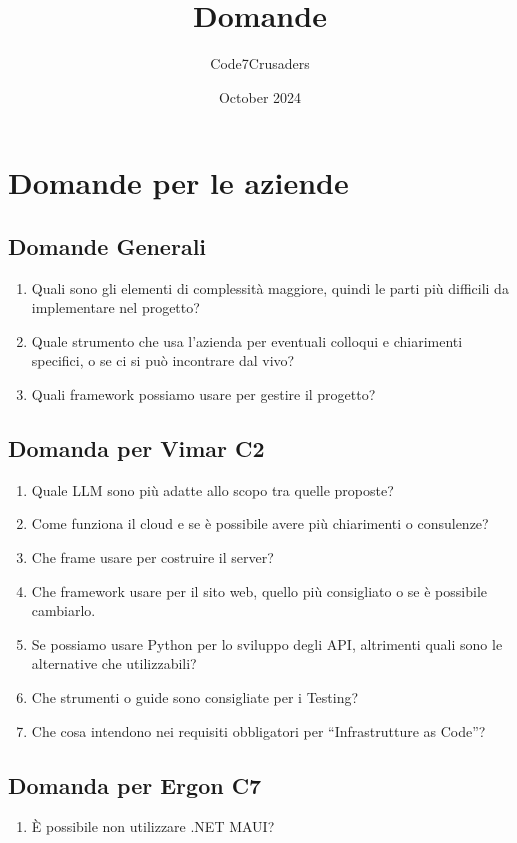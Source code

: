 \documentclass{article}
\title{Domande}
\author{Code7Crusaders}
\date{October 2024}
\begin{document}
\maketitle

\section{Domande per le aziende}
\subsection{Domande Generali}
\begin{enumerate}
    \item Quali sono gli elementi di complessità maggiore, quindi le parti più difficili da implementare nel progetto?
    \item Quale strumento che usa l’azienda per eventuali colloqui e chiarimenti specifici, o se ci si può incontrare dal vivo?
    \item Quali framework possiamo usare per gestire il progetto? 
\end{enumerate}


\subsection{Domanda per Vimar C2}

\begin{enumerate}
    \item Quale LLM sono più adatte allo scopo tra quelle proposte?
    \item Come funziona il cloud e se è possibile avere più chiarimenti o consulenze?
    \item Che frame usare per costruire il server?
    \item Che framework usare per il sito web, quello più consigliato o se è possibile cambiarlo.
    \item Se possiamo usare Python per lo sviluppo degli API, altrimenti quali sono le alternative che utilizzabili?
    \item Che strumenti o guide sono consigliate per i Testing?
    \item Che cosa intendono nei requisiti obbligatori per “Infrastrutture as Code”?
\end{enumerate}

\subsection{Domanda per Ergon C7}
\begin{enumerate}
    \item È possibile non utilizzare .NET MAUI?
\end{enumerate}
\end{document}
